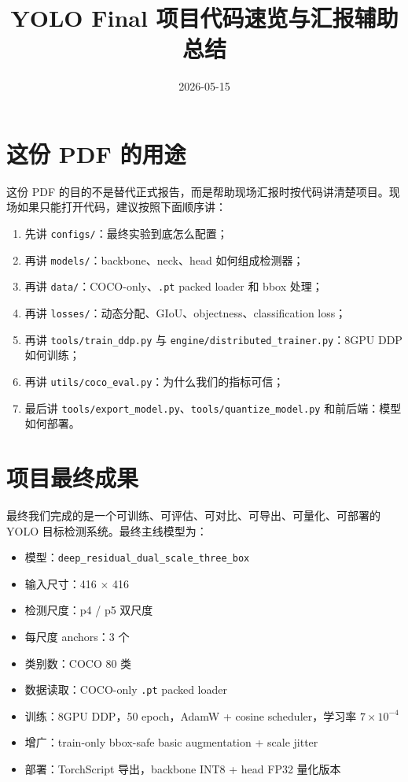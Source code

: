 \documentclass[11pt,a4paper]{article}
\title{YOLO Final 项目代码速览与汇报辅助总结}
\author{}
\date{2026-05-15}
\newcommand{\code}[1]{\texttt{#1}}
\begin{document}
\maketitle
\tableofcontents
\newpage

\section{这份 PDF 的用途}

这份 PDF 的目的不是替代正式报告，而是帮助现场汇报时按代码讲清楚项目。现场如果只能打开代码，建议按照下面顺序讲：

\begin{enumerate}[label=\arabic*.]
  \item 先讲 \code{configs/}：最终实验到底怎么配置；
  \item 再讲 \code{models/}：backbone、neck、head 如何组成检测器；
  \item 再讲 \code{data/}：COCO-only、\code{.pt} packed loader 和 bbox 处理；
  \item 再讲 \code{losses/}：动态分配、GIoU、objectness、classification loss；
  \item 再讲 \code{tools/train\_ddp.py} 与 \code{engine/distributed\_trainer.py}：8GPU DDP 如何训练；
  \item 再讲 \code{utils/coco\_eval.py}：为什么我们的指标可信；
  \item 最后讲 \code{tools/export\_model.py}、\code{tools/quantize\_model.py} 和前后端：模型如何部署。
\end{enumerate}

\section{项目最终成果}

最终我们完成的是一个可训练、可评估、可对比、可导出、可量化、可部署的 YOLO 目标检测系统。最终主线模型为：

\begin{itemize}
  \item 模型：\code{deep\_residual\_dual\_scale\_three\_box}
  \item 输入尺寸：416 $\times$ 416
  \item 检测尺度：p4 / p5 双尺度
  \item 每尺度 anchors：3 个
  \item 类别数：COCO 80 类
  \item 数据读取：COCO-only \code{.pt} packed loader
  \item 训练：8GPU DDP，50 epoch，AdamW + cosine scheduler，学习率 $7\times10^{-4}$
  \item 增广：train-only bbox-safe basic augmentation + scale jitter
  \item 部署：TorchScript 导出，backbone INT8 + head FP32 量化版本
\end{itemize}
\end{document}
